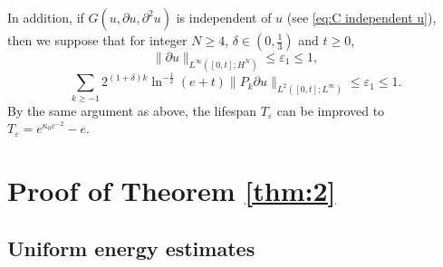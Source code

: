 \documentclass[11pt,twoside]{article}
\def\f{\frac}
\def\p{\partial}
\theoremstyle{plain}
\theoremstyle{definition}
\numberwithin{equation}{section}
\begin{document}
In addition, if $G(u, \p u, \p^2 u)$ is independent of $u$ (see \eqref{eq:C independent u}),
then we suppose that for integer $N\ge 4$, $\delta\in(0,\f{1}{3})$ and $t\ge0$,
	\begin{equation}\label{bootstrap11}
	\|\p u\|_{L^\infty([0,t];H^N)}\le \varepsilon_1\le1,	
	\end{equation}
	\begin{equation}\label{bootstrap12}
		\sum_{k\ge-1}2^{(1+\delta) k}\ln^{-\f12}(e+t)\|P_k\p u\|_{L^{2}([0,t];L^\infty)}\le \varepsilon_1\le1.
	\end{equation}
By the same argument as above, the lifespan $T_\varepsilon$ can be improved to $T_\varepsilon=e^{\kappa_0 \varepsilon^{-2}}-e$.



\section{Proof of Theorem \ref{thm:2}}\label{Section 6}

\subsection{Uniform energy estimates}\label{Sec.6.1}
\end{document}
